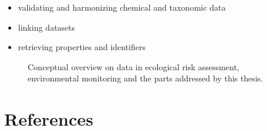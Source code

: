 \begin{itemize}
	\item validating and harmonizing chemical and taxonomic data
	\item linking datasets
	\item retrieving properties and identifiers
\end{itemize}




\begin{figure}[h]
	\centering
	\resizebox{\textwidth}{!}{%
		
	}
	\caption[Conceptual overview of the topics addressed by this thesis]{Conceptual overview on data in ecological risk assessment, environmental monitoring and the parts addressed by this thesis.}
	\label{fig:intro:overview}
\end{figure}




\newpage
\section{References}
\printbibliography[heading=none, sorting=nyt]
